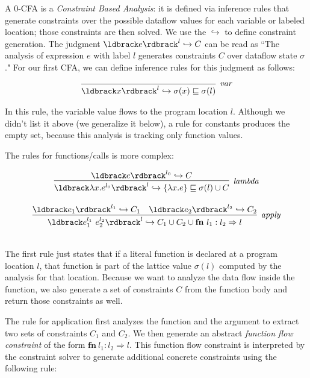 \documentclass[11pt]{article}
\begin{document}
A 0-CFA is a \emph{Constraint Based Analysis}: it is defined via inference rules
that generate constraints over the possible dataflow values for each variable or
labeled location; those constraints are then solved.  
We use the $\hookrightarrow$ to define constraint generation.  The judgment $\parg{e}^l \hookrightarrow C$ can be read as ``The analysis of expression $e$ with label $l$ generates constraints $C$ over dataflow state $\sigma$."  For our first CFA, we can define inference rules for this judgment as follows:

\[
\begin{array}{c}
\infer[\textit{var}]
	{\parg{x}^l \hookrightarrow \sigma(x) \sqsubseteq \sigma(l)}
	{}\\
\end{array}
\]

In this rule, the variable value flows to the program location $l$. Although we
didn't list it above (we generalize it below), a rule for constants produces the
empty set, because this analysis is tracking only function values.

The rules for functions/calls is more complex: 

\[
\begin{array}{c}
\infer[\textit{lambda}]
	{\parg{\lambda x . e^{l_0}}^l \hookrightarrow \{\lambda x . e\} \alap \sigma(l) \cup C}
	{\parg{e}^{l_0} \hookrightarrow C}\\[3ex]
	
\infer[\textit{apply}]
	{\parg{e_1^{l_1} ~ e_2^{l_2}}^l \hookrightarrow C_1 \cup C_2 \cup \textbf{fn}~l_1: l_2 \Rightarrow l}
	{\parg{e_1}^{l_1} \hookrightarrow C_1 & \parg{e_2}^{l_2} \hookrightarrow C_2}\\[3ex]
	
\end{array}
\]


The first rule just states that if a literal function is declared at a program
location $l$, that function is part of the lattice value $\sigma(l)$ computed by
the analysis for that location.  Because we want to analyze the data flow inside
the function, we also generate a set of constraints $C$ from the function body
and return those constraints as well. 

The rule for application first analyzes the function and the argument to extract
two sets of constraints $C_1$ and $C_2$. We then generate an abstract
\textit{function flow constraint} of the form
$\textbf{fn}~l_1: l_2 \Rightarrow l$. This function flow constraint is
interpreted by the constraint solver to generate additional concrete constraints
using the following rule:
\end{document}
